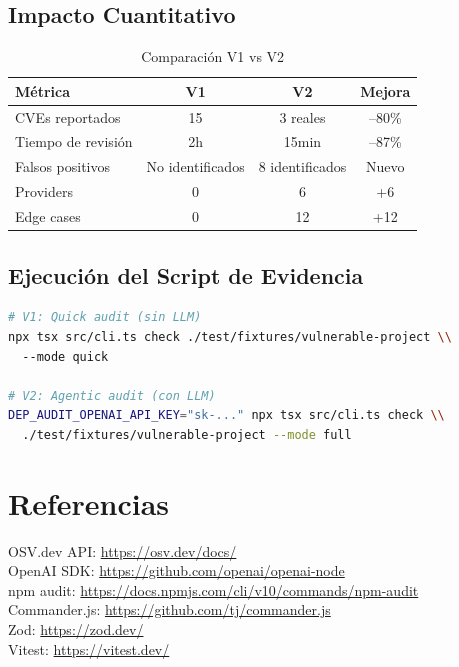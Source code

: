 \documentclass[11pt,a4paper]{article}
\begin{document}
\subsection{Impacto Cuantitativo}

\begin{table}[H]
  \centering
  \caption{Comparación V1 vs V2}
  \begin{tabularx}{\textwidth}{l c c c}
    \toprule
    \textbf{Métrica} & \textbf{V1} & \textbf{V2} & \textbf{Mejora} \\
    \midrule
    CVEs reportados & 15 & 3 reales & --80\% \\
    Tiempo de revisión & 2h & 15min & --87\% \\
    Falsos positivos & No identificados & 8 identificados & Nuevo \\
    Providers & 0 & 6 & +6 \\
    Edge cases & 0 & 12 & +12 \\
    \bottomrule
  \end{tabularx}
\end{table}

\subsection{Ejecución del Script de Evidencia}

\begin{lstlisting}[language=bash]
# V1: Quick audit (sin LLM)
npx tsx src/cli.ts check ./test/fixtures/vulnerable-project \\
  --mode quick

# V2: Agentic audit (con LLM)
DEP_AUDIT_OPENAI_API_KEY="sk-..." npx tsx src/cli.ts check \\
  ./test/fixtures/vulnerable-project --mode full
\end{lstlisting}

\section*{Referencias}

\noindent
OSV.dev API: \url{https://osv.dev/docs/}\\
OpenAI SDK: \url{https://github.com/openai/openai-node}\\
npm audit: \url{https://docs.npmjs.com/cli/v10/commands/npm-audit}\\
Commander.js: \url{https://github.com/tj/commander.js}\\
Zod: \url{https://zod.dev/}\\
Vitest: \url{https://vitest.dev/}
\end{document}
